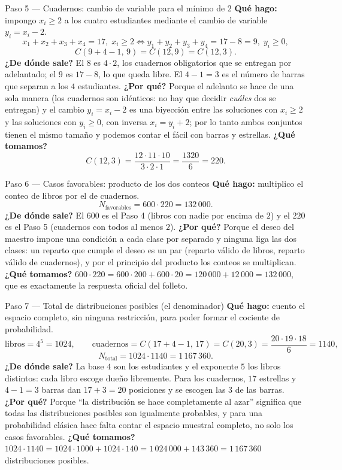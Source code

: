 \documentclass[11pt]{article}
\begin{document}
\begin{paso}{Paso 5 --- Cuadernos: cambio de variable para el mínimo de 2}
\textbf{Qué hago:} impongo $x_i\ge 2$ a los cuatro estudiantes mediante el cambio de variable $y_i=x_i-2$.
\[
x_1+x_2+x_3+x_4=17,\;x_i\ge2\iff y_1+y_2+y_3+y_4=17-8=9,\;y_i\ge0,
\]
\[
C(9+4-1,\,9)=C(12,9)=C(12,3).
\]
\textbf{¿De dónde sale?} El $8$ es $4\cdot 2$, los cuadernos obligatorios que se entregan por adelantado; el $9$ es $17-8$, lo que queda libre. El $4-1=3$ es el número de barras que separan a los $4$ estudiantes.
\textbf{¿Por qué?} Porque el adelanto se hace de una sola manera (los cuadernos son idénticos: no hay que decidir \emph{cuáles} dos se entregan) y el cambio $y_i=x_i-2$ es una biyección entre las soluciones con $x_i\ge2$ y las soluciones con $y_i\ge0$, con inversa $x_i=y_i+2$; por lo tanto ambos conjuntos tienen el mismo tamaño y podemos contar el fácil con barras y estrellas.
\textbf{¿Qué tomamos?}
\[
C(12,3)=\frac{12\cdot 11\cdot 10}{3\cdot 2\cdot 1}=\frac{1320}{6}=220 .
\]
\end{paso}

\begin{paso}{Paso 6 --- Casos favorables: producto de los dos conteos}
\textbf{Qué hago:} multiplico el conteo de libros por el de cuadernos.
\[
N_{\text{favorables}}=600\cdot 220=132\,000 .
\]
\textbf{¿De dónde sale?} El $600$ es el Paso 4 (libros con nadie por encima de $2$) y el $220$ es el Paso 5 (cuadernos con todos al menos $2$).
\textbf{¿Por qué?} Porque el deseo del maestro impone una condición a cada clase por separado y ninguna liga las dos clases: un reparto que cumple el deseo es un par (reparto válido de libros, reparto válido de cuadernos), y por el principio del producto los conteos se multiplican.
\textbf{¿Qué tomamos?} $600\cdot 220=600\cdot 200+600\cdot 20=120\,000+12\,000=132\,000$, que es exactamente la respuesta oficial del folleto.
\end{paso}

\begin{paso}{Paso 7 --- Total de distribuciones posibles (el denominador)}
\textbf{Qué hago:} cuento el espacio completo, sin ninguna restricción, para poder formar el cociente de probabilidad.
\[
\text{libros}=4^5=1024,\qquad \text{cuadernos}=C(17+4-1,\,17)=C(20,3)=\frac{20\cdot19\cdot18}{6}=1140 ,
\]
\[
N_{\text{total}}=1024\cdot 1140=1\,167\,360 .
\]
\textbf{¿De dónde sale?} La base $4$ son los estudiantes y el exponente $5$ los libros distintos: cada libro escoge dueño libremente. Para los cuadernos, $17$ estrellas y $4-1=3$ barras dan $17+3=20$ posiciones y se escogen las $3$ de las barras.
\textbf{¿Por qué?} Porque ``la distribución se hace completamente al azar'' significa que todas las distribuciones posibles son igualmente probables, y para una probabilidad clásica hace falta contar el espacio muestral completo, no solo los casos favorables.
\textbf{¿Qué tomamos?} $1024\cdot 1140=1024\cdot 1000+1024\cdot 140=1\,024\,000+143\,360=1\,167\,360$ distribuciones posibles.
\end{paso}
\end{document}
